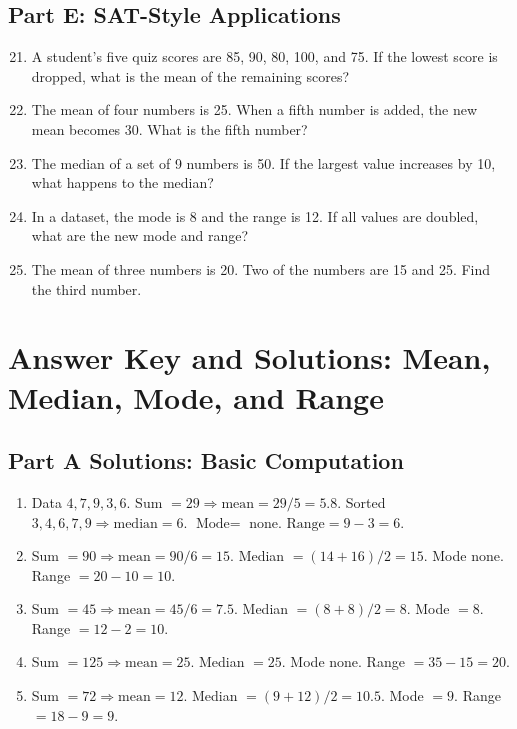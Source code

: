 \documentclass[12pt]{article}
\begin{document}
\subsection*{Part E: SAT-Style Applications}
\begin{enumerate}
  \setcounter{enumi}{20}
  \item A student’s five quiz scores are 85, 90, 80, 100, and 75. If the lowest score is dropped, what is the mean of the remaining scores?
  \item The mean of four numbers is 25. When a fifth number is added, the new mean becomes 30. What is the fifth number?
  \item The median of a set of 9 numbers is 50. If the largest value increases by 10, what happens to the median?
  \item In a dataset, the mode is 8 and the range is 12. If all values are doubled, what are the new mode and range?
  \item The mean of three numbers is 20. Two of the numbers are 15 and 25. Find the third number.
\end{enumerate}

\newpage


\section*{Answer Key and Solutions: Mean, Median, Mode, and Range}

\subsection*{Part A Solutions: Basic Computation}
\begin{enumerate}
  \item Data \(4,7,9,3,6\). Sum \(=29\Rightarrow \text{mean}=29/5=5.8\). Sorted \(3,4,6,7,9\Rightarrow \text{median}=6\). \(\text{Mode}=\) none. \(\text{Range}=9-3=6\).
  \item Sum \(=90\Rightarrow \text{mean}=90/6=15\). Median \(=(14+16)/2=15\). Mode none. Range \(=20-10=10\).
  \item Sum \(=45\Rightarrow \text{mean}=45/6=7.5\). Median \(=(8+8)/2=8\). Mode \(=8\). Range \(=12-2=10\).
  \item Sum \(=125\Rightarrow \text{mean}=25\). Median \(=25\). Mode none. Range \(=35-15=20\).
  \item Sum \(=72\Rightarrow \text{mean}=12\). Median \(=(9+12)/2=10.5\). Mode \(=9\). Range \(=18-9=9\).
\end{enumerate}
\end{document}
